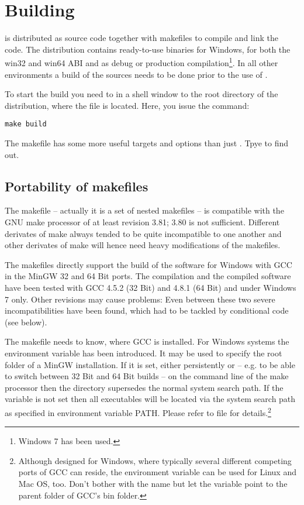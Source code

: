 \chapter{Building \linnet{}}
\label{secBuildingLinNet}

\linnet{} is distributed as source code together with makefiles to compile
and link the code. The distribution contains ready-to-use binaries for
Windows, for both the win32 and win64 ABI and as debug or production
compilation\footnote{Windows 7 has been used.}. In all other environments
a build of the sources needs to be done prior to the use of \linnet{}.

To start the build you need to  in a shell window to the root
directory of the \linnet{} distribution, where the file 
is located. Here, you issue the command:
\begin{verbatim}
make build
\end{verbatim}
The makefile has some more useful targets and options than just
. Tpye  to find out.


\section{Portability of makefiles}

The makefile -- actually it is a set of nested makefiles -- is compatible
with the GNU make processor of at least revision 3.81; 3.80 is not
sufficient. Different derivates of make always tended to be quite
incompatible to one another and other derivates of make will hence need
heavy modifications of the makefiles.

The makefiles directly support the build of the software for Windows with
GCC in the MinGW 32 and 64 Bit ports. The compilation and the compiled
software have been tested with GCC 4.5.2 (32 Bit) and 4.8.1 (64 Bit) and
under Windows 7 only. Other revisions may cause problems: Even between
these two severe incompatibilities have been found, which had to be
tackled by conditional code (see below).

The makefile needs to know, where GCC is installed. For Windows systems
the environment variable  has been introduced. It may
be used to specify the root folder of a MinGW installation. If it is set,
either persistently or -- e.g. to be able to switch between 32 Bit and 64
Bit builds -- on the command line of the make processor then the directory
 supersedes the normal system search path. If
the variable is not set then all executables will be located via the
system search path as specified in environment variable PATH. Please refer
to file  for details.\footnote{Although designed for
Windows, where typically several different competing ports of GCC can
reside, the environment variable can be used for Linux and Mac OS, too.
Don't bother with the name but let the variable point to the parent folder
of GCC's bin folder.}

